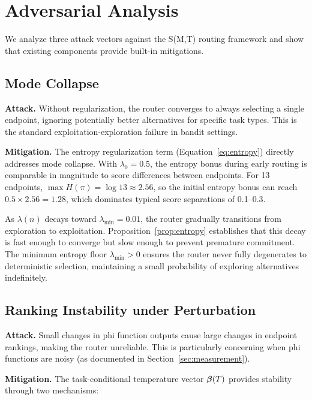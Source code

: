 \section{Adversarial Analysis}
\label{sec:adversarial}

We analyze three attack vectors against the S(M,T) routing framework and show that existing components provide built-in mitigations.

\subsection{Mode Collapse}

\textbf{Attack.} Without regularization, the router converges to always selecting a single endpoint, ignoring potentially better alternatives for specific task types. This is the standard exploitation-exploration failure in bandit settings.

\textbf{Mitigation.} The entropy regularization term (Equation~\ref{eq:entropy}) directly addresses mode collapse. With $\lambda_0 = 0.5$, the entropy bonus during early routing is comparable in magnitude to score differences between endpoints. For 13 endpoints, $\max H(\pi) = \log 13 \approx 2.56$, so the initial entropy bonus can reach $0.5 \times 2.56 = 1.28$, which dominates typical score separations of 0.1--0.3.

As $\lambda(n)$ decays toward $\lambda_{\min} = 0.01$, the router gradually transitions from exploration to exploitation. Proposition~\ref{prop:entropy} establishes that this decay is fast enough to converge but slow enough to prevent premature commitment. The minimum entropy floor $\lambda_{\min} > 0$ ensures the router never fully degenerates to deterministic selection, maintaining a small probability of exploring alternatives indefinitely.

\subsection{Ranking Instability under Perturbation}

\textbf{Attack.} Small changes in phi function outputs cause large changes in endpoint rankings, making the router unreliable. This is particularly concerning when phi functions are noisy (as documented in Section~\ref{sec:measurement}).

\textbf{Mitigation.} The task-conditional temperature vector $\boldsymbol{\beta}(T)$ provides stability through two mechanisms:

